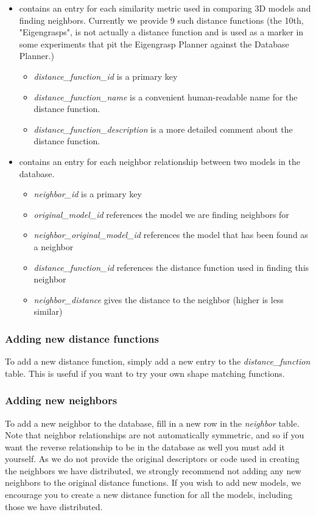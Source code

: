 \begin{itemize}
	\item {} contains an entry for each
      similarity metric used in comparing 3D models and finding
      neighbors. Currently we provide 9 such distance functions (the
      10th, "Eigengrasps", is not actually a distance function and is
      used as a marker in some experiments that pit the Eigengrasp
      Planner against the Database Planner.)
		\begin{itemize}
			\item \emph{distance\_function\_id} is a primary key
			\item \emph{distance\_function\_name} is a convenient
              human-readable name for the distance function.
			\item \emph{distance\_function\_description} is a more
              detailed comment about the distance function.
		\end{itemize}
	\item {} contains an entry for each neighbor
      relationship between two models in the database.
		\begin{itemize}
			\item \emph{neighbor\_id} is a primary key
			\item \emph{original\_model\_id} references the model we
              are finding neighbors for
			\item \emph{neighbor\_original\_model\_id} references the
              model that has been found as a neighbor
			\item \emph{distance\_function\_id} references the
              distance function used in finding this neighbor
			\item \emph{neighbor\_distance} gives the distance to the
              neighbor (higher is less similar)
		\end{itemize}
\end{itemize}


\subsubsection{Adding new distance functions}
To add a new distance function, simply add a new entry to the
\emph{distance\_function} table. This is useful if you want to try
your own shape matching functions.

\subsubsection{Adding new neighbors}
To add a new neighbor to the database, fill in a new row in the
\emph{neighbor} table. Note that neighbor relationships are not
automatically symmetric, and so if you want the reverse relationship
to be in the database as well you must add it yourself. As we do not
provide the original descriptors or code used in creating the
neighbors we have distributed, we strongly recommend not adding any
new neighbors to the original distance functions. If you wish to add
new models, we encourage you to create a new distance function for all
the models, including those we have distributed.



